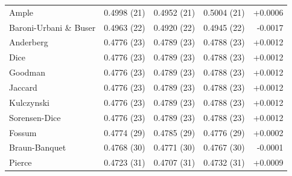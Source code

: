 \begin{table}[t]
{\begin{tabular}{lrrrr}
Ample & 0.4998 (21) & 0.4952 (21) & 0.5004 (21) & +0.0006 \\
Baroni-Urbani \& Buser & 0.4963 (22) & 0.4920 (22) & 0.4945 (22) & -0.0017 \\
Anderberg & 0.4776 (23) & 0.4789 (23) & 0.4788 (23) & +0.0012 \\
Dice & 0.4776 (23) & 0.4789 (23) & 0.4788 (23) & +0.0012 \\
Goodman & 0.4776 (23) & 0.4789 (23) & 0.4788 (23) & +0.0012 \\
Jaccard & 0.4776 (23) & 0.4789 (23) & 0.4788 (23) & +0.0012 \\
Kulczynski & 0.4776 (23) & 0.4789 (23) & 0.4788 (23) & +0.0012 \\
Sorensen-Dice & 0.4776 (23) & 0.4789 (23) & 0.4788 (23) & +0.0012 \\
Fossum & 0.4774 (29) & 0.4785 (29) & 0.4776 (29) & +0.0002 \\
Braun-Banquet & 0.4768 (30) & 0.4771 (30) & 0.4767 (30) & -0.0001 \\
Pierce & 0.4723 (31) & 0.4707 (31) & 0.4732 (31) & +0.0009 \\
\bottomrule
\end{tabular}
}
\end{table}
